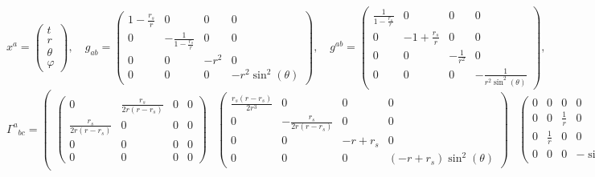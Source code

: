\documentclass[11pt]{article}
\begin{document}
    $$x^{a}=\begin{pmatrix}t\\r\\\theta\\\varphi\end{pmatrix},\quad g_{ab}=\begin{pmatrix} 1 - \frac{r_{s}}{r} & 0 & 0 & 0\\ 0 & - \frac{1}{1 - \frac{r_{s}}{r}} & 0 & 0\\ 0 & 0 & - r^{2} & 0\\ 0 & 0 & 0 & - r^{2} \sin^{2}{\left(\theta \right)} \end{pmatrix},\quad g^{ab}=\begin{pmatrix} \frac{1}{1 - \frac{r_{s}}{r}} & 0 & 0 & 0\\ 0 & -1 + \frac{r_{s}}{r} & 0 & 0\\ 0 & 0 & - \frac{1}{r^{2}} & 0\\ 0 & 0 & 0 & - \frac{1}{r^{2} \sin^{2}{\left(\theta \right)}} \end{pmatrix},$$
$${\Gamma^{a}}_{bc}=\begin{pmatrix} \begin{pmatrix} 0 & \frac{r_{s}}{2 r \left(r - r_{s}\right)} & 0 & 0\\ \frac{r_{s}}{2 r \left(r - r_{s}\right)} & 0 & 0 & 0\\ 0 & 0 & 0 & 0\\ 0 & 0 & 0 & 0 \end{pmatrix} & \begin{pmatrix} \frac{r_{s} \left(r - r_{s}\right)}{2 r^{3}} & 0 & 0 & 0\\ 0 & - \frac{r_{s}}{2 r \left(r - r_{s}\right)} & 0 & 0\\ 0 & 0 & - r + r_{s} & 0\\ 0 & 0 & 0 & \left(- r + r_{s}\right) \sin^{2}{\left(\theta \right)} \end{pmatrix} & \begin{pmatrix} 0 & 0 & 0 & 0\\ 0 & 0 & \frac{1}{r} & 0\\ 0 & \frac{1}{r} & 0 & 0\\ 0 & 0 & 0 & - \sin{\left(\theta \right)} \cos{\left(\theta \right)} \end{pmatrix} & \begin{pmatrix} 0 & 0 & 0 & 0\\ 0 & 0 & 0 & \frac{1}{r}\\ 0 & 0 & 0 & \frac{1}{\tan{\left(\theta \right)}}\\ 0 & \frac{1}{r} & \frac{1}{\tan{\left(\theta \right)}} & 0 \end{pmatrix} \end{pmatrix},$$
\end{document}
